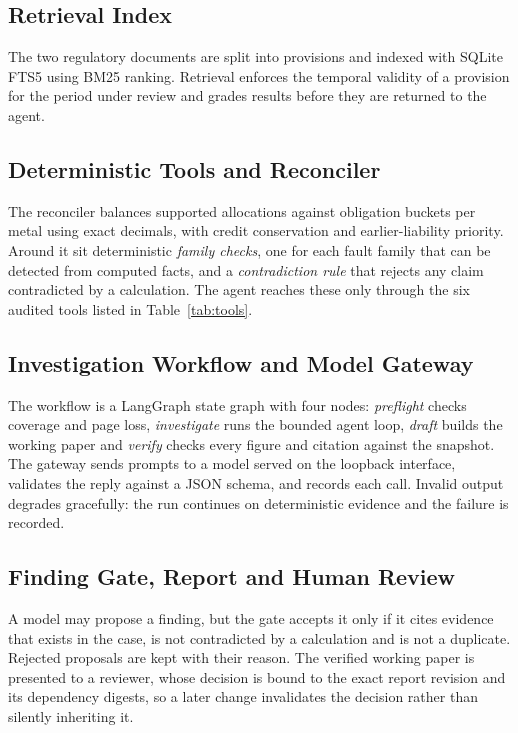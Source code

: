 \subsection{Retrieval Index}
The two regulatory documents are split into provisions and indexed with SQLite FTS5 using BM25
ranking. Retrieval enforces the temporal validity of a provision for the period under review and
grades results before they are returned to the agent.

\subsection{Deterministic Tools and Reconciler}
The reconciler balances supported allocations against obligation buckets per metal using exact
decimals, with credit conservation and earlier-liability priority. Around it sit deterministic
\emph{family checks}, one for each fault family that can be detected from computed facts, and a
\emph{contradiction rule} that rejects any claim contradicted by a calculation. The agent reaches
these only through the six audited tools listed in Table~\ref{tab:tools}.

\subsection{Investigation Workflow and Model Gateway}
The workflow is a LangGraph state graph with four nodes: \emph{preflight} checks coverage and page
loss, \emph{investigate} runs the bounded agent loop, \emph{draft} builds the working paper and
\emph{verify} checks every figure and citation against the snapshot. The gateway sends prompts to
a model served on the loopback interface, validates the reply against a JSON schema, and records
each call. Invalid output degrades gracefully: the run continues on deterministic evidence and the
failure is recorded.

\subsection{Finding Gate, Report and Human Review}
A model may propose a finding, but the gate accepts it only if it cites evidence that exists in the
case, is not contradicted by a calculation and is not a duplicate. Rejected proposals are kept with
their reason. The verified working paper is presented to a reviewer, whose decision is bound to the
exact report revision and its dependency digests, so a later change invalidates the decision rather
than silently inheriting it.

